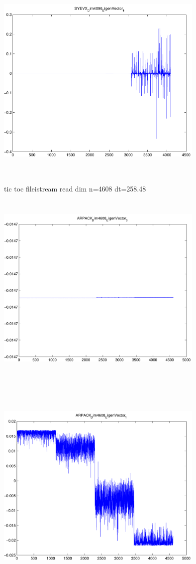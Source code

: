 \documentclass[9pt]{article}
\theoremstyle{plain}
\theoremstyle{definition}
\theoremstyle{remark}
\numberwithin{equation}{section}
\begin{document}
\includegraphics[width=10.0cm,height=10.0cm]{SYEVX_Dim4096_EigenVector_4.pdf}

tic toc fileistream read dim n=4608 dt=258.48
\includegraphics[width=10.0cm,height=10.0cm]{ARPACK_Dim4608_EigenVector_0.pdf}

\includegraphics[width=10.0cm,height=10.0cm]{ARPACK_Dim4608_EigenVector_1.pdf}
\end{document}
